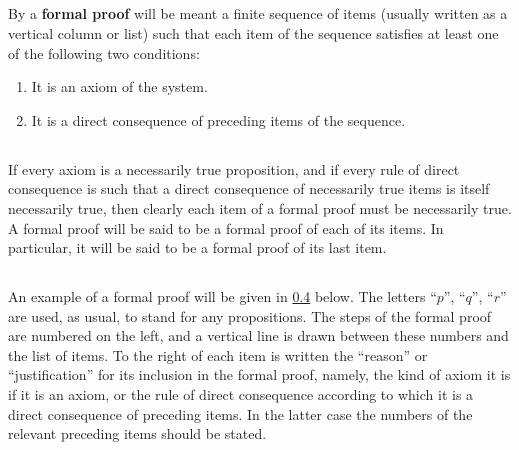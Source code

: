 \documentclass{book}
\begin{document}
\subsection{}
\label{sec:4.3}

By a \textbf{formal proof} will be meant a finite sequence of items (usually written as a vertical column or list) such that each item of the sequence satisfies at least one of the following two conditions:
\begin{enumerate}[resume*,start=1]
\item It is an axiom of the system.
\item It is a direct consequence of preceding items of the sequence.
\end{enumerate}

\subsection{}
\label{sec:4.4}

If every axiom is a necessarily true proposition, and if every rule of direct consequence is such that a direct consequence of necessarily true items is itself necessarily true, then clearly each item of a formal proof must be necessarily true.  A formal proof will be said to be a formal proof of each of its items.  In particular, it will be said to be a formal proof of its last item.

\subsection{}
\label{sec:4.5}

An example of a formal proof will be given in \ref{sec:4.6} below.  The letters “\(p\)”, “\(q\)”, “\(r\)” are used, as usual, to stand for any propositions.  The steps of the formal proof are numbered on the left, and a vertical line is drawn between these numbers and the list of items.  To the right of each item is written the “reason” or “justification” for its inclusion in the formal proof, namely, the kind of axiom it is if it is an axiom, or the rule of direct consequence according to which it is a direct consequence of preceding items.  In the latter case the numbers of the relevant preceding items should be stated.

\subsection{}
\label{sec:4.6}

\leavevmode
\end{document}
